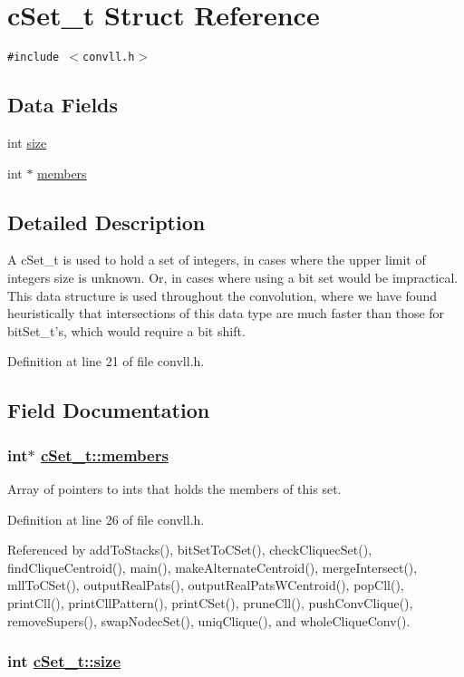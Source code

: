 \hypertarget{structcSet__t}{
\section{c\-Set\_\-t Struct Reference}
\label{structcSet__t}
}
{\tt \#include $<$convll.h$>$}

\subsection*{Data Fields}
\begin{CompactItemize}
\item 
int \hyperlink{structcSet__t_o0}{size}
\item 
int $\ast$ \hyperlink{structcSet__t_o1}{members}
\end{CompactItemize}


\subsection*{Detailed Description}
A c\-Set\_\-t is used to hold a set of integers, in cases where the upper limit of integers size is unknown. Or, in cases where using a bit set would be impractical. This data structure is used throughout the convolution, where we have found heuristically that intersections of this data type are much faster than those for bit\-Set\_\-t's, which would require a bit shift.



Definition at line 21 of file convll.h.

\subsection*{Field Documentation}
\hypertarget{structcSet__t_o1}{
\subsubsection[members]{\setlength{\rightskip}{0pt plus 5cm}int$\ast$ \hyperlink{structcSet__t_o1}{c\-Set\_\-t::members}}}
\label{structcSet__t_o1}


Array of pointers to ints that holds the members of this set. 

Definition at line 26 of file convll.h.

Referenced by add\-To\-Stacks(), bit\-Set\-To\-CSet(), check\-Cliquec\-Set(), find\-Clique\-Centroid(), main(), make\-Alternate\-Centroid(), merge\-Intersect(), mll\-To\-CSet(), output\-Real\-Pats(), output\-Real\-Pats\-WCentroid(), pop\-Cll(), print\-Cll(), print\-Cll\-Pattern(), print\-CSet(), prune\-Cll(), push\-Conv\-Clique(), remove\-Supers(), swap\-Nodec\-Set(), uniq\-Clique(), and whole\-Clique\-Conv().\hypertarget{structcSet__t_o0}{
\subsubsection[size]{\setlength{\rightskip}{0pt plus 5cm}int \hyperlink{structcSet__t_o0}{c\-Set\_\-t::size}}}
\label{structcSet__t_o0}


